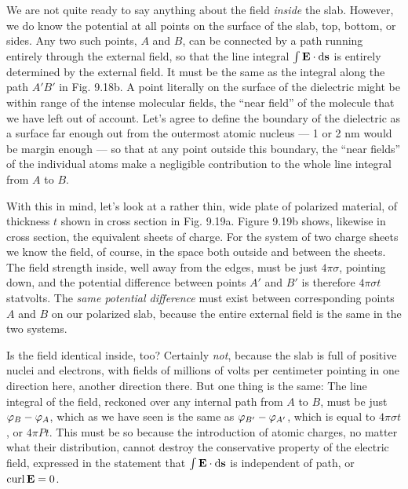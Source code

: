 We are not quite ready to say anything about the field \emph{inside} the
slab. However, we do know the potential at all points on the surface
of the slab, top, bottom, or sides. Any two such points, $A$ and $B$,
can be connected by a path running entirely through the external
field, so that the line integral $\int\mathbf{E}\cdot\operatorname{d\!}\mathbf{s}$ is entirely determined by the
external field. It must be the same as the integral along the path $A'B'$
in Fig. 9.18b. A point literally on the surface of the dielectric might
be within range of the intense molecular fields, the ``near field'' of
the molecule that we have left out of account. Let's agree to define
the boundary of the dielectric as a surface far enough out from the
outermost atomic nucleus --- 1 or 2 nm would be margin
enough --- so that at any point outside this boundary, the ``near fields''
of the individual atoms make a negligible contribution to the whole
line integral from $A$ to $B$.

With this in mind, let's look at a rather thin, wide plate of polarized
material, of thickness $t$ shown in cross section in Fig. 9.19a. Figure
9.19b shows, likewise in cross section, the equivalent sheets of charge.
For the system of two charge sheets we know the field, of course, in
the space both outside and between the sheets. The field strength
inside, well away from the edges, must be just $4\pi\sigma$, pointing down,
and the potential difference between points $A'$ and $B'$ is therefore
$4\pi\sigma t$ statvolts. The \emph{same potential difference} must exist between
corresponding points $A$ and $B$ on our polarized slab, because the
entire external field is the same in the two systems.

Is the field identical inside, too? Certainly \emph{not}, because the slab
is full of positive nuclei and electrons, with fields of millions of volts
per centimeter pointing in one direction here, another direction there.
But one thing is the same: The line integral of the field, reckoned over
any internal path from $A$ to $B$, must be just $\varphi_B-\varphi_A$, which as we have
seen is the same as $\varphi_{B'}-\varphi_{A'}$, which is equal to $4\pi\sigma t$, or $4\pi P t$. This
must be so because the introduction of atomic charges, no matter
what their distribution, cannot destroy the conservative property of
the electric field, expressed in the statement that $\int\mathbf{E}\cdot\operatorname{d\!}\mathbf{s}$ is independent
of path, or $\operatorname{curl} \mathbf{E} = 0$.


